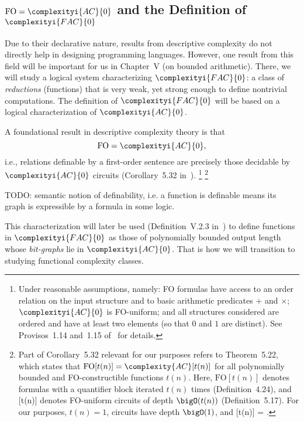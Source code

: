 \subsection{\texorpdfstring{$\mathrm{FO} = \complexityi{AC}{0}$}{FO = AC0} and the Definition of \texorpdfstring{$\complexityi{FAC}{0}$}{FAC0}}

Due to their declarative nature, results from descriptive complexity do not
directly help in designing programming languages.
However, one result from this field will be important for us in
Chapter~V (on bounded arithmetic). There, we will study a logical system
characterizing \(\complexityi{FAC}{0}\): a class of \emph{reductions} (functions) that is very weak,
yet strong enough to define nontrivial computations.
The definition of \(\complexityi{FAC}{0}\) will be based on a logical characterization of
\(\complexityi{AC}{0}\).

A foundational result in descriptive complexity theory is that
\[
\mathrm{FO} = \complexityi{AC}{0},
\]
i.e., relations definable by a first-order sentence are precisely those
decidable by \(\complexityi{AC}{0}\) circuits
(Corollary~5.32 in~\cite{Immerman1999-IMMDC}).%
\footnote{%
Under reasonable assumptions, namely:
FO formulas have access to an order relation on the input structure and to
basic arithmetic predicates \(+\) and \(\times\);
\(\complexityi{AC}{0}\) is FO-uniform; and
all structures considered are ordered and have at least two elements (so that
\(0\) and \(1\) are distinct).
See Provisos~1.14 and~1.15 of~\cite{Immerman1999-IMMDC} for details.%
}
\footnote{%
Part of Corollary~5.32 relevant for our purposes refers to Theorem~5.22,
which states that \(\mathrm{FO}[t(n)] = {\complexity{AC}}[t(n)]\)
for all polynomially bounded and FO-constructible functions \(t(n)\).
Here, \(\mathrm{FO}[t(n)]\) denotes formulas with a quantifier block iterated
\(t(n)\) times (Definition~4.24), and
{}[t(n)] denotes FO-uniform circuits of depth \(\bigO(t(n))\)
(Definition~5.17).
For our purposes, \(t(n) = 1\), circuits have depth \(\bigO(1)\),
and {}[t(n)] = .%
}

TODO: semantic notion of definability, i.e. a function is definable means
its graph is expressible by a formula in some logic.

This characterization will later be used (Definition~V.2.3 in~\cite{Cook_Nguyen_2010})
to define functions in \(\complexityi{FAC}{0}\) as those of polynomially bounded output length
whose \emph{bit-graphs} lie in \(\complexityi{AC}{0}\).
That is how we will transition to studying functional complexity classes.

